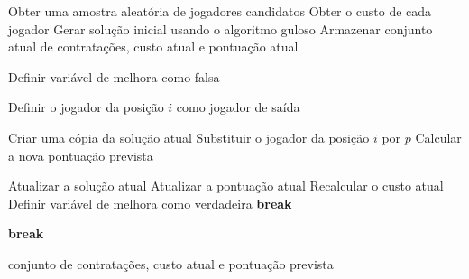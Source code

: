 \begin{algorithm}[H]
\caption{Busca Local com estratégia First Improvement}
\label{alg:busca_local_first}
\begin{algorithmic}

\State Obter uma amostra aleatória de jogadores candidatos
\State Obter o custo de cada jogador
\State Gerar solução inicial usando o algoritmo guloso
\State Armazenar conjunto atual de contratações, custo atual e pontuação atual

    \State Definir variável de melhora como falsa

        \State Definir o jogador da posição $i$ como jogador de saída

                \State Criar uma cópia da solução atual
                \State Substituir o jogador da posição $i$ por $p$
                \State Calcular a nova pontuação prevista

                    \State Atualizar a solução atual
                    \State Atualizar a pontuação atual
                    \State Recalcular o custo atual
                    \State Definir variável de melhora como verdadeira
                    \State \textbf{break} 
                \EndIf
            \EndIf
        \EndFor

            \State \textbf{break}
        \EndIf
    \EndFor
\EndWhile

\State \Return conjunto de contratações, custo atual e pontuação prevista

\end{algorithmic}
\end{algorithm}